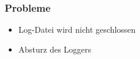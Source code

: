 \begin{frame}
	
	\frametitle{Probleme}
	\begin{itemize}
		\item Log-Datei wird nicht geschlossen
		\item Absturz des Loggers
	\end{itemize}
	
\end{frame}